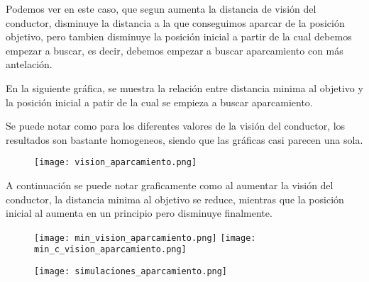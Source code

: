 Podemos ver en este caso, que segun aumenta la distancia de visión del conductor, disminuye la distancia a la que conseguimos aparcar de la posición objetivo, pero tambien disminuye la posición inicial a partir de la cual debemos empezar a buscar, es decir, debemos empezar a buscar aparcamiento con más antelación.

En la siguiente gráfica, se muestra la relación entre distancia minima al objetivo y la posición inicial a patir de la cual se empieza a buscar aparcamiento.

Se puede notar como para los diferentes valores de la visión del conductor, los resultados son bastante homogeneos, siendo que las gráficas casi parecen una sola.

\begin{figure}[h]
\texttt{[image: vision\_aparcamiento.png]}
\centering
\end{figure}

\newpage

A continuación se puede notar graficamente como al aumentar la visión del conductor, la distancia minima al objetivo se reduce, mientras que la posición inicial al aumenta en un principio pero disminuye finalmente.
\begin{figure}[h]
\texttt{[image: min\_vision\_aparcamiento.png]}
\texttt{[image: min\_c\_vision\_aparcamiento.png]}
\centering
\end{figure}

\newpage

\begin{table}[h]
\centering
{}
\end{table}

\begin{figure}[h]
\texttt{[image: simulaciones\_aparcamiento.png]}
\centering
\end{figure}

